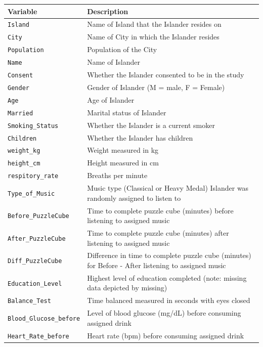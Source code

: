 \documentclass[
]{report}
\begin{document}
\begin{longtable}[]{@{}
  >{\raggedright\arraybackslash}p{}
  >{\raggedright\arraybackslash}p{}@{}}
\toprule
\textbf{Variable} & \textbf{Description} \\
\midrule
\endhead
\texttt{Island} & Name of Island that the Islander resides on \\
\texttt{City} & Name of City in which the Islander resides \\
\texttt{Population} & Population of the City \\
\texttt{Name} & Name of Islander \\
\texttt{Consent} & Whether the Islander consented to be in the study \\
\texttt{Gender} & Gender of Islander (M = male, F = Female) \\
\texttt{Age} & Age of Islander \\
\texttt{Married} & Marital status of Islander \\
\texttt{Smoking\_Status} & Whether the Islander is a current smoker \\
\texttt{Children} & Whether the Islander has children \\
\texttt{weight\_kg} & Weight measured in kg \\
\texttt{height\_cm} & Height measured in cm \\
\texttt{respitory\_rate} & Breaths per minute \\
\texttt{Type\_of\_Music} & Music type (Classical or Heavy Medal) Islander was randomly assigned to listen to \\
\texttt{Before\_PuzzleCube} & Time to complete puzzle cube (minutes) before listening to assigned music \\
\texttt{After\_PuzzleCube} & Time to complete puzzle cube (minutes) after listening to assigned music \\
\texttt{Diff\_PuzzleCube} & Difference in time to complete puzzle cube (minutes) for Before - After listening to assigned music \\
\texttt{Education\_Level} & Highest level of education completed (note: missing data depicted by missing) \\
\texttt{Balance\_Test} & Time balanced measured in seconds with eyes closed \\
\texttt{Blood\_Glucose\_before} & Level of blood glucose (mg/dL) before consuming assigned drink \\
\texttt{Heart\_Rate\_before} & Heart rate (bpm) before consuming assigned drink \\

\end{longtable}
\end{document}

